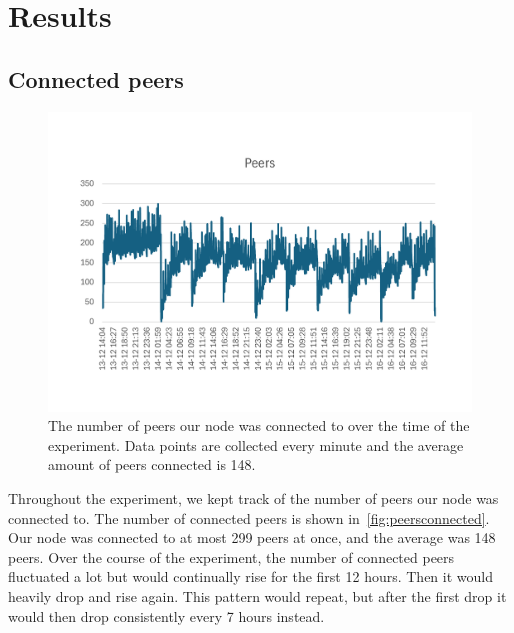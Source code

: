\section{Results}\label{sec:results}

\subsection{Connected peers}\label{subsec:connected-peers}
\begin{figure}[!ht]
    \centering
    \includegraphics[scale = 0.5]{figures/conPeer2}
    \caption{The number of peers our node was connected to over the time of the experiment.
    Data points are collected every minute and the average amount of peers connected is 148.}
    \label{fig:peersconnected}
\end{figure}
Throughout the experiment, we kept track of the number of peers our node was connected to.
The number of connected peers is shown in~\autoref{fig:peersconnected}.
Our node was connected to at most 299 peers at once, and the average was 148 peers.
Over the course of the experiment, the number of connected peers fluctuated a lot but would continually rise for the first 12 hours.
Then it would heavily drop and rise again.
This pattern would repeat, but after the first drop it would then drop consistently every 7 hours instead.

